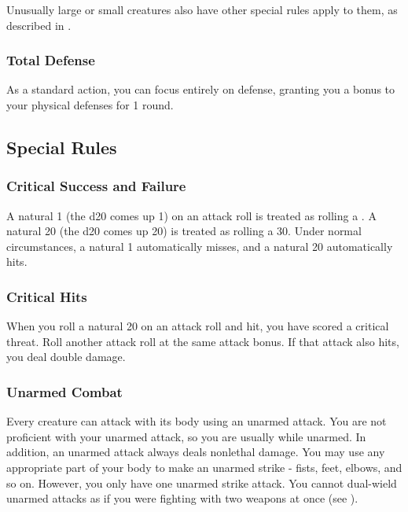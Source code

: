 Unusually large or small creatures also have other special rules apply to them, as described in .

\subsubsection{Total Defense}\label{Total Defense}
As a standard action, you can focus entirely on defense, granting you a  bonus to your physical defenses for 1 round.

\subsection{Special Rules}\label{Special Rules}

\subsubsection{Critical Success and Failure}\label{Critical Success and Failure}
A natural 1 (the d20 comes up 1) on an attack roll is treated as rolling a .
A natural 20 (the d20 comes up 20) is treated as rolling a 30.
Under normal circumstances, a natural 1 automatically misses, and a natural 20 automatically hits.

\subsubsection{Critical Hits}\label{Critical Hits}
When you roll a natural 20 on an attack roll and hit, you have scored a critical threat.
Roll another attack roll at the same attack bonus.
If that attack also hits, you deal double damage.


\subsubsection{Unarmed Combat}\label{Unarmed Combat}
Every creature can attack with its body using an unarmed attack.
You are not proficient with your unarmed attack, so you are usually  while unarmed.
In addition, an unarmed attack always deals nonlethal damage.
You may use any appropriate part of your body to make an unarmed strike - fists, feet, elbows, and so on.
However, you only have one unarmed strike attack.
You cannot dual-wield unarmed attacks as if you were fighting with two weapons at once (see ).

